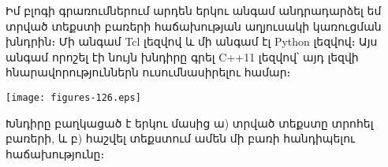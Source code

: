\documentclass{minimal}
\begin{document}
Իմ բլոգի գրառումներում արդեն երկու անգամ անդրադարձել եմ 
տրված տեքստի բառերի հա\-ճախության աղյուսակի կառուցման խնդրին։ 
Մի անգամ Tcl լեզվով և մի անգամ էլ Python լեզվով։ Այս անգամ 
որոշել էի նույն խնդիրը գրել C++11 լեզվով՝ այդ լեզվի 
հնարավորութ\-յուններն ուսումնասիրելու համար։

\begin{center}
\texttt{[image: figures-126.eps]}
\end{center}

Խնդիրը բաղկացած է երկու մասից ա) տրված տեքստը տրոհել բառերի, 
և բ) հաշվել տեքս\-տում ամեն մի բառի հանդիպելու հաճախութ\-յունը։
\end{document}
